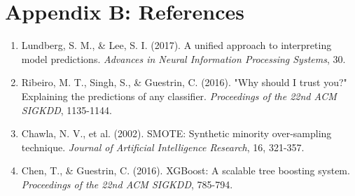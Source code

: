\documentclass[11pt,a4paper]{article}
\begin{document}
\section*{Appendix B: References}

\begin{enumerate}
    \item Lundberg, S. M., \& Lee, S. I. (2017). A unified approach to interpreting model predictions. \textit{Advances in Neural Information Processing Systems}, 30.
    \item Ribeiro, M. T., Singh, S., \& Guestrin, C. (2016). "Why should I trust you?" Explaining the predictions of any classifier. \textit{Proceedings of the 22nd ACM SIGKDD}, 1135-1144.
    \item Chawla, N. V., et al. (2002). SMOTE: Synthetic minority over-sampling technique. \textit{Journal of Artificial Intelligence Research}, 16, 321-357.
    \item Chen, T., \& Guestrin, C. (2016). XGBoost: A scalable tree boosting system. \textit{Proceedings of the 22nd ACM SIGKDD}, 785-794.
\end{enumerate}
\end{document}
